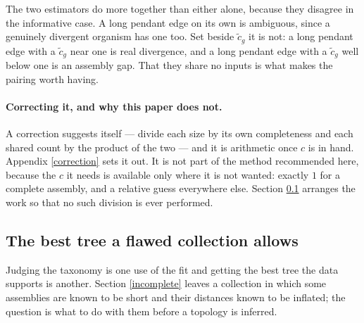 \documentclass[pdflatex,sn-vancouver-num]{sn-jnl}
\begin{document}
The two estimators do more together than either alone, because they disagree in the informative case.
A long pendant edge on its own is ambiguous, since a genuinely divergent organism has one too. Set
beside $\tilde{c}_g$ it is not: a long pendant edge with a $\tilde{c}_g$ near one is real divergence,
and a long pendant edge with a $\tilde{c}_g$ well below one is an assembly gap. That they
share no inputs is what makes the pairing worth having.

\paragraph{Correcting it, and why this paper does not.} A correction suggests itself --- divide each
size by its own completeness and each shared count by the product of the two --- and it is arithmetic
once $c$ is in hand. Appendix \ref{correction} sets it out. It is not part of the method recommended
here, because the $c$ it needs is available only where it is not wanted: exactly $1$ for a complete
assembly, and a relative guess everywhere else. Section \ref{besttree} arranges the work so that no
such division is ever performed.

\subsection{The best tree a flawed collection allows}\label{besttree}

Judging the taxonomy is one use of the fit and getting the best tree the data supports is another.
Section \ref{incomplete} leaves a collection in which some assemblies are known to be short and their
distances known to be inflated; the question is what to do with them before a topology is inferred.
\end{document}
